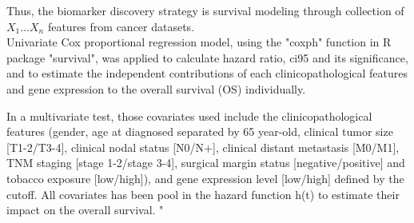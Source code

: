 \documentclass[preprint,12pt]{elsarticle}
\newenvironment{MyColorPar}[1]{%
    \leavevmode\color{#1}\ignorespaces%
}{%
}%
\begin{document}
\begin{MyColorPar}{blue}
\begin{MyColorPar}{red}
Thus, the biomarker discovery strategy is survival modeling through collection of $X_1...X_n$ features from cancer datasets.\\[1cm]

Univariate Cox proportional regression model, using the "coxph" function in R package "survival", was applied to calculate hazard ratio, \acrfull{ci95} and its significance, and to estimate the independent contributions of each clinicopathological features and gene expression to the overall survival (OS) individually.


In a multivariate test, those covariates used include the clinicopathological features (gender, age at diagnosed separated by 65 year-old, clinical tumor size [T1-2/T3-4], clinical nodal status [N0/N+], clinical distant metastasis [M0/M1], TNM staging [stage 1-2/stage 3-4], surgical margin status [negative/positive] and tobacco exposure [low/high]), and gene expression level [low/high] defined by the cutoff.
All covariates has been pool in the hazard function h(t) to estimate their impact on the overall survival.
"
\end{MyColorPar}


\end{MyColorPar}%







\end{document}
